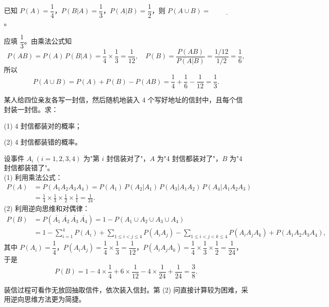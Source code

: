 \documentclass[lang=cn,11pt]{elegantbook}
\begin{document}
\begin{exercise}\label{exer:1-12}
已知 \(P(A)=\dfrac{1}{4}\)，\(P(B|A)=\dfrac{1}{3}\)，\(P(A|B)=\dfrac{1}{2}\)，则 \(P(A \cup B)=\underline{\hspace{2cm}}\)。
\end{exercise}
\begin{solution}
应填 \(\dfrac{1}{3}\)。由乘法公式知
\[
P(AB) = P(A)\,P(B|A) = \frac{1}{4} \times \frac{1}{3} = \frac{1}{12}, \quad P(B) = \frac{P(AB)}{P(A|B)} = \frac{1/12}{1/2} = \frac{1}{6},
\]
所以
\[
P(A \cup B) = P(A) + P(B) - P(AB) = \frac{1}{4} + \frac{1}{6} - \frac{1}{12} = \frac{1}{3}.
\]
\end{solution}

\begin{exercise}\label{exer:1-13}
某人给四位亲友各写一封信，然后随机地装入 4 个写好地址的信封中，且每个信封装一封信。求：
\par
(1) 4 封信都装对的概率；\par
(2) 4 封信都装错的概率。
\end{exercise}
\begin{solution}
设事件 \(A_i\ (i=1,2,3,4)\) 为"第 \(i\) 封信装对了"，\(A\) 为"4 封信都装对了"，\(B\) 为"4 封信都装错了"。\\
(1) 利用乘法公式：
\[
\begin{aligned}
P(A) &= P(A_1 A_2 A_3 A_4) = P(A_1)\,P(A_2|A_1)\,P(A_3|A_1 A_2)\,P(A_4|A_1 A_2 A_3) \\
&= \frac{1}{4} \times \frac{1}{3} \times \frac{1}{2} \times \frac{1}{1} = \frac{1}{24}.
\end{aligned}
\]
(2) 利用逆向思维和对偶律：
\[
\begin{aligned}
P(B) &= P(\overline{A_1}\,\overline{A_2}\,\overline{A_3}\,\overline{A_4}) = 1 - P(A_1 \cup A_2 \cup A_3 \cup A_4) \\
&= 1 - \sum_{i=1}^{4} P(A_i) + \sum_{1 \le i < j \le 4} P(A_i A_j) - \sum_{1 \le i < j < k \le 4} P(A_i A_j A_k) + P(A_1 A_2 A_3 A_4),
\end{aligned}
\]
其中 \(P(A_i)=\dfrac{1}{4}\)，\(P(A_i A_j)=\dfrac{1}{4} \times \dfrac{1}{3}=\dfrac{1}{12}\)，\(P(A_i A_j A_k)=\dfrac{1}{4} \times \dfrac{1}{3} \times \dfrac{1}{2}=\dfrac{1}{24}\)，于是
\[
P(B) = 1 - 4 \times \frac{1}{4} + 6 \times \frac{1}{12} - 4 \times \frac{1}{24} + \frac{1}{24} = \frac{3}{8}.
\]
\end{solution}

\begin{note}
装信过程可看作无放回抽取信件，依次装入信封。第 (2) 问直接计算较为困难，采用逆向思维方法更为简捷。
\end{note}
\end{document}
